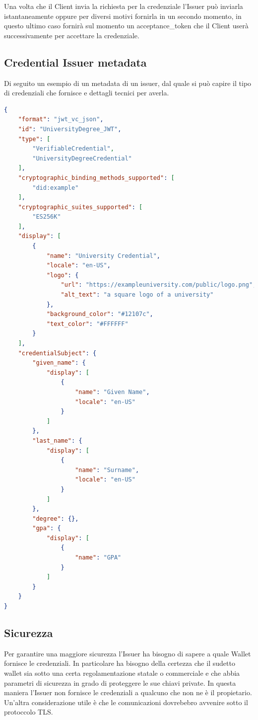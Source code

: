 Una volta che il Client invia la richiesta per la credenziale l'Issuer può inviarla istantaneamente oppure per diversi motivi
fornirla in un secondo momento, in questo ultimo caso fornirà sul momento un acceptance\_token che il Client userà successivamente per accettare
la credenziale.

\subsection{Credential Issuer metadata}
Di seguito un esempio di un metadata di un issuer, dal quale si può capire il tipo di credenziali che fornisce e dettagli tecnici per averla.

\begin{lstlisting}[language=json,firstnumber=1]
{
    "format": "jwt_vc_json",
    "id": "UniversityDegree_JWT",
    "type": [
        "VerifiableCredential",
        "UniversityDegreeCredential"
    ],
    "cryptographic_binding_methods_supported": [
        "did:example"
    ],
    "cryptographic_suites_supported": [
        "ES256K"
    ],
    "display": [
        {
            "name": "University Credential",
            "locale": "en-US",
            "logo": {
                "url": "https://exampleuniversity.com/public/logo.png",
                "alt_text": "a square logo of a university"
            },
            "background_color": "#12107c",
            "text_color": "#FFFFFF"
        }
    ],
    "credentialSubject": {
        "given_name": {
            "display": [
                {
                    "name": "Given Name",
                    "locale": "en-US"
                }
            ]
        },
        "last_name": {
            "display": [
                {
                    "name": "Surname",
                    "locale": "en-US"
                }
            ]
        },
        "degree": {},
        "gpa": {
            "display": [
                {
                    "name": "GPA"
                }
            ]
        }
    }
}
\end{lstlisting}

\subsection{Sicurezza}
Per garantire una maggiore sicurezza l'Issuer ha bisogno di sapere a quale Wallet fornisce le credenziali.
In particolare ha bisogno della certezza che il sudetto wallet sia sotto una certa regolamentazione statale o commerciale e che abbia parametri di sicurezza
in grado di proteggere le sue chiavi private. In questa maniera l'Issuer non fornisce le credenziali a qualcuno che non ne è il propietario.\\
Un'altra considerazione utile è che le comunicazioni dovrebebro avvenire sotto il protoccolo TLS.